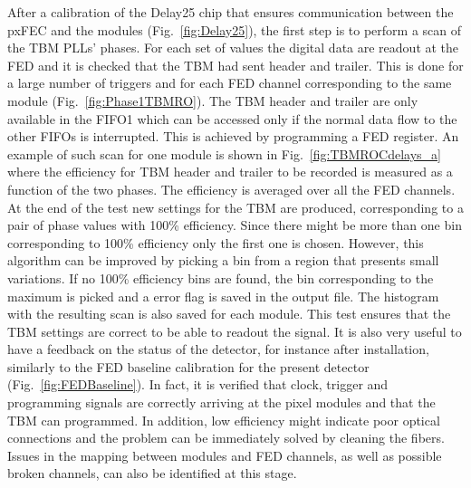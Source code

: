 After a calibration of the Delay25 chip that ensures communication between the pxFEC and the modules (Fig.~\ref{fig:Delay25}), the first step is to perform a scan of the TBM PLLs' phases.
For each set of values the digital data are readout at the FED and it is checked that the TBM had sent header and trailer. This is done for a large number of triggers and for each FED channel corresponding to the same module (Fig.~\ref{fig:Phase1TBMRO}).
The TBM header and trailer are only available in the FIFO1 which can be accessed only if the normal data flow to the other FIFOs is interrupted. This is achieved by programming a FED register.
An example of such scan for one module is shown in Fig.~\ref{fig:TBMROCdelays_a} where the efficiency for TBM header and trailer to be recorded is measured as a function of the two phases.
The efficiency is averaged over all the FED channels.
At the end of the test new settings for the TBM are produced, corresponding to a pair of phase values with 100\% efficiency. Since there might be more than one bin corresponding to 100\% efficiency only the first one is chosen. However, this algorithm can be improved by picking a bin from a region that presents small variations. If no 100\% efficiency bins are found, the bin corresponding to the maximum is picked and a error flag is saved in the output file. The histogram with the resulting scan is also saved for each module.
This test ensures that the TBM settings are correct to be able to readout the signal. It is also very useful to have a feedback on the status of the detector, for instance after installation, similarly to the FED baseline calibration for the present detector (Fig.~\ref{fig:FEDBaseline}). In fact, it is verified that clock, trigger and programming signals are correctly arriving at the pixel modules and that the TBM can programmed.
In addition, low efficiency might indicate poor optical connections and the problem can be immediately solved by cleaning the fibers.
Issues in the mapping between modules and FED channels, as well as possible broken channels, can also be identified at this stage.\\

